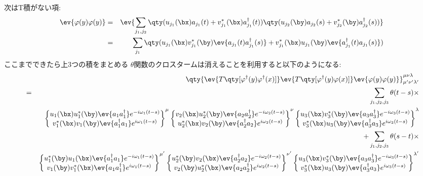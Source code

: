\documentclass[10.5pt,a4paper]{jreport}
\begin{document}
次はT積がない項:
\begin{eqnarray}
  \ev{\varphi(y)\varphi(y)} &=& \ev{\sum_{j_1, j_2}\qty(u_{j_1}(\bx)a_{j_1}(t) + v_{j_1}^*(\bx)a_{j_1}^\dagger(t))\qty(u_{j_2}(\by)a_{j_2}(s) + v^*_{j_2}(\by)a^\dagger_{j_2}(s))}\\
  &=& \sum_{j_1}\qty(u_{j_1}(\bx)v^*_{j_1}(\by)\ev{a_{j_1}(t)a^\dagger_{j_1}(s)} + v_{j_1}^*(\bx)u_{j_1}(\by)\ev{a_{j_1}^\dagger(t)a_{j_1}(s)})
\end{eqnarray}
ここまでできたら上3つの積をまとめる $\theta$関数のクロスタームは消えることを利用すると以下のようになる:
\begin{eqnarray}
  &&\qty{\ev{T\qty[\varphi^\dagger(y)\varphi^\dagger(x)]}\ev{T\qty[\varphi^\dagger(y)\varphi(x)]}\ev{\varphi(y)\varphi(y)}}^{\mu\nu\lambda}_{\mu'\nu'\lambda'}\\
\nonumber  &=& \sum_{j_1, j_2, j_3}\theta(t-s)\times\\
\nonumber  &&\begin{Bmatrix}
    u_{1}(\bx)u_{1}^*(\by)\ev{a_{1}a_{1}^\dagger}e^{-i\omega_1(t-s)}\\
    v_{1}^*(\bx)v_{1}(\by)\ev{a_{1}^\dagger a_{1}}e^{i\omega_1(t-s)}
  \end{Bmatrix}^\mu
\begin{Bmatrix}
  v_{2}(\bx)u^*_{2}(\by)\ev{a_{2}a_{2}^\dagger}e^{-i\omega_2(t-s)}\\
    u^*_{2}(\bx)v_{2}(\by)\ev{a_{2}^\dagger a_{2}}e^{i\omega_2(t-s)}
  \end{Bmatrix}^\nu
  \begin{Bmatrix}
    u_{3}(\bx)v^*_{3}(\by)\ev{a_{3}a^\dagger_{3}}e^{-i\omega_3(t-s)}\\
    v_{3}^*(\bx)u_{3}(\by)\ev{a_{3}^\dagger a_{3}}e^{i\omega_3(t-s)}
  \end{Bmatrix}^\lambda\\
  \nonumber  &&+ \sum_{j_1, j_2, j_3}\theta(s-t)\times\\
  \nonumber  &&\begin{Bmatrix}
    u_{1}^*(\by)u_{1}(\bx)\ev{a_{1}^\dagger a_{1}}e^{-i\omega_1(t-s)}\\
    v_{1}(\by)v_{1}^*(\bx)\ev{a_{1}a_{1}^\dagger}e^{i\omega_1(t-s)}
  \end{Bmatrix}^{\mu'}
  \begin{Bmatrix}
    u^*_{2}(\by)v_{2}(\bx)\ev{a_{2}^\dagger a_{2}}e^{-i\omega_2(t-s)}\\
    v_{2}(\by)u^*_{2}(\bx)\ev{a_{2}a_{2}^\dagger}e^{i\omega_2(t-s)}
  \end{Bmatrix}^{\nu'}
  \begin{Bmatrix}
    u_{3}(\bx)v^*_{3}(\by)\ev{a_{3}a^\dagger_{3}}e^{-i\omega_3(t-s)}\\
    v_{3}^*(\bx)u_{3}(\by)\ev{a_{3}^\dagger a_{3}}e^{i\omega_3(t-s)}
  \end{Bmatrix}^{\lambda'}\\
\end{eqnarray}
\end{document}
